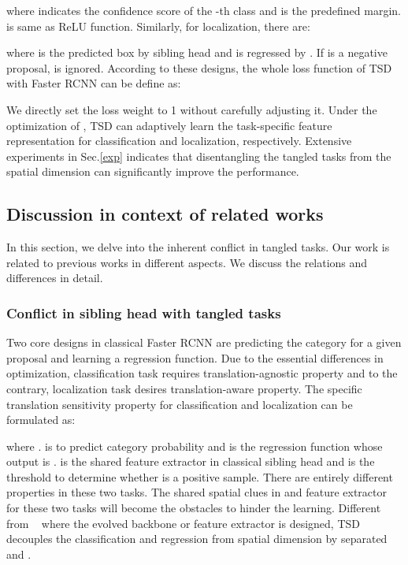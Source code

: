 \documentclass[10pt,twocolumn,letterpaper]{article}
\def \algname{TSD}
\begin{document}
where  indicates the confidence score of the -th class and  is the predefined margin.  is same as ReLU function.
Similarly, for localization, there are:

where  is the predicted box by sibling head and  is regressed by .
If  is a negative proposal,  is ignored.
According to these designs, the whole loss function of \algname{} with Faster RCNN can be define as:

We directly set the loss weight to 1 without carefully adjusting it.
Under the optimization of , \algname{} can adaptively learn the task-specific feature representation for classification and localization, respectively.
Extensive experiments in Sec.\ref{exp} indicates that disentangling the tangled tasks from the spatial dimension can significantly improve the performance.

\subsection{Discussion in context of related works}
In this section, we delve into the inherent conflict in tangled tasks.
Our work is related to previous works in different aspects. We discuss the relations and differences in detail.
\subsubsection{Conflict in sibling head with tangled tasks}\label{discuss}

Two core designs in classical Faster RCNN are predicting the category for a given proposal and learning a regression function.
Due to the essential differences in optimization, classification task requires translation-agnostic property and to the contrary, localization task desires translation-aware property.
The specific translation sensitivity property for classification and localization can be formulated as:

where .  is to predict category probability and  is the regression function whose output is .
 is the shared feature extractor in classical sibling head and  is the threshold to determine whether  is a positive sample.
There are entirely different properties in these two tasks.
The shared spatial clues in  and feature extractor for these two tasks will become the obstacles to hinder the learning.
Different from ~\cite{wu2019rethinking,jiang2018acquisition,dai2017deformable,zhu2019deformable} where the evolved backbone or feature extractor is designed, \algname{} decouples the classification and regression from spatial dimension by separated  and .
\end{document}
